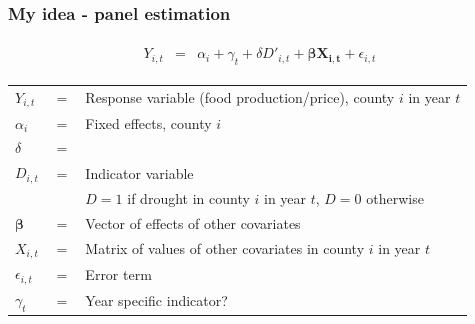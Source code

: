\documentclass{beamer}              %
\begin{document}
\begin{frame}

\frametitle{My idea - panel estimation}\label{MySuggestion4} 


\begin{align*}
\begin{array}{lcl}
 Y_{i,t} &=& \alpha_i +\gamma_t + \delta D'_{i,t} +  \boldsymbol{\beta X_{i,t}}+ \epsilon_{i,t}
\end{array}
\end{align*}

\begin{table}
\begin{small}
\begin{tabular}{lll}

$Y_{i,t}$ &$=$& Response variable (food production/price), county $i$ in year $t$\\
$\alpha_i$ &$=$& Fixed effects, county $i$\\
{\color{darkblue}$\delta$ }&{\color{darkblue}$=$}&{\color{darkblue}{Effect of drought on economy}}\\
$D_{i,t}$ &$=$& Indicator variable\\
& &  $D=1$ if drought in county $i$ in year $t$, $D=0$ otherwise\\
$\boldsymbol{\beta}$ &$=$& Vector of effects of other covariates\\
$X_{i,t}$ &$=$& Matrix of values of other covariates in county $i$ in year $t$\\
$\epsilon_{i,t}$ &$=$& Error term \\
{\color{DarkGreen}$\gamma_t$} & {\color{DarkGreen}$=$}& {\color{DarkGreen}Year specific indicator?}
\end{tabular}
\end{small}
\end{table}

\end{frame}







\section*{}


\end{document}
